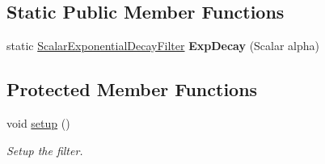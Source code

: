 \subsection*{Static Public Member Functions}
\begin{DoxyCompactItemize}
\item 
static \hyperlink{classow__core_1_1ScalarExponentialDecayFilter}{Scalar\+Exponential\+Decay\+Filter} {\bfseries Exp\+Decay} (Scalar alpha)\hypertarget{classow__core_1_1ScalarExponentialDecayFilter_abef3d459d8f728b5430206cc7ff5dfc5}{}\label{classow__core_1_1ScalarExponentialDecayFilter_abef3d459d8f728b5430206cc7ff5dfc5}

\end{DoxyCompactItemize}
\subsection*{Protected Member Functions}
\begin{DoxyCompactItemize}
\item 
void \hyperlink{classow__core_1_1ScalarExponentialDecayFilter_ac9eac55a2143886afe22e7e41087d501}{setup} ()\hypertarget{classow__core_1_1ScalarExponentialDecayFilter_ac9eac55a2143886afe22e7e41087d501}{}\label{classow__core_1_1ScalarExponentialDecayFilter_ac9eac55a2143886afe22e7e41087d501}

\begin{DoxyCompactList}\small\item\em Setup the filter. \end{DoxyCompactList}\end{DoxyCompactItemize}
